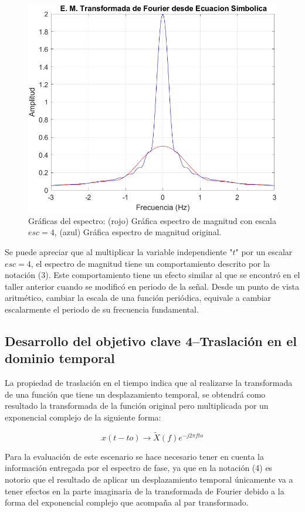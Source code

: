 \documentclass[11pt,letterpaper,twocolumn]{article}
\begin{document}
        \begin{figure}[H]
            \centering 
                \includegraphics[width=0.5\linewidth]{img/Propescala.png}
            \caption{Gráficas del espectro: (rojo) Gráfica 
                 espectro de magnitud con escala $esc=4$, (azul) Gráfica espectro de magnitud original.}
            \label{P3}
        \end{figure}
        \vspace{-5mm}
            
        Se puede apreciar que al multiplicar la variable independiente "$t$" por un escalar $esc=4$, el espectro de magnitud tiene un comportamiento descrito por la notación (3). Este comportamiento tiene un efecto similar al que se encontró en el taller anterior cuando se modificó en periodo de la señal. Desde un punto de vista aritmético, cambiar la escala de una función periódica, equivale a cambiar escalarmente el periodo de su frecuencia fundamental.
        
    \subsection{Desarrollo del objetivo clave 4--Traslación en el dominio temporal}
        La propiedad de traslación en el tiempo indica que al realizarse la transformada de una función que tiene un desplazamiento temporal, se obtendrá como resultado la transformada de la función original pero multiplicada por un exponencial complejo de la siguiente forma: 
        
        \begin{equation}
            {x}(t-to) \rightarrow \tilde{X}(f) e^{-j2 \pi fto}
            \label{TTiempo}
        \end{equation}
        
        Para la evaluación de este escenario se hace necesario tener en cuenta la información entregada por el espectro de fase, ya que en la notación (4) es notorio que el resultado de aplicar un desplazamiento temporal únicamente va a tener efectos en la parte imaginaria de la transformada de Fourier debido a la forma del exponencial complejo que acompaña al par transformado.
        
\end{document}
